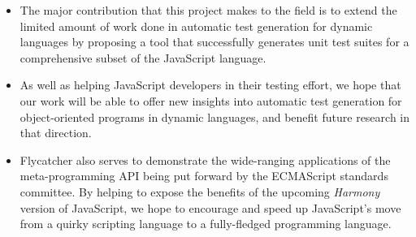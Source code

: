 \begin{itemize}
   \item The major contribution that this project makes to the field is to extend the limited amount of work done in automatic test generation for dynamic languages by proposing a tool that successfully generates unit test suites for a comprehensive subset of the JavaScript language.
   \item As well as helping JavaScript developers in their testing effort, we hope that our work will be able to offer new insights into automatic test generation for object-oriented programs in dynamic languages, and benefit future research in that direction.
   \item \textsf{Flycatcher} also serves to demonstrate the wide-ranging applications of the meta-programming API being put forward by the ECMAScript standards committee. By helping to expose the benefits of the upcoming \emph{Harmony} version of JavaScript, we hope to encourage and  speed up JavaScript's move from a quirky scripting language to a fully-fledged programming language.
\end{itemize}